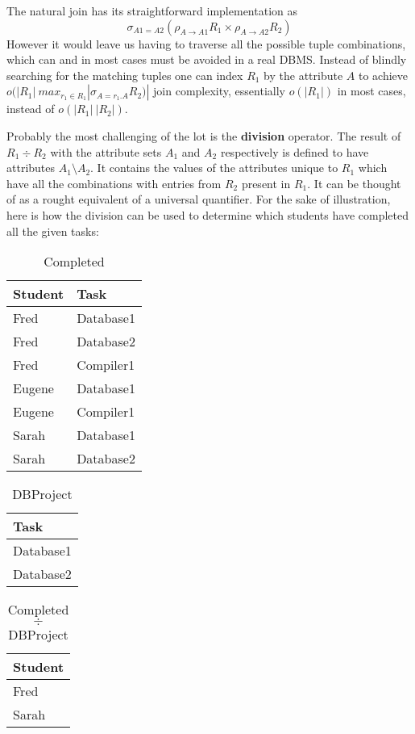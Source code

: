 \documentclass[12pt]{article}
\begin{document}
The natural join has its straightforward implementation as
$$\sigma_{A1=A2}(\rho_{A  \rightarrow  A1} R_1 \times \rho_{A \rightarrow A2} R_2)$$
However it would leave us having to traverse all the possible tuple combinations, which can and in most
cases must be avoided in a real DBMS. Instead of blindly searching for the matching tuples one
can index $R_1$ by the attribute $A$ to achieve $o(|R_1|\ max_{r_1 \in R_1} |\sigma_{A={r_1}.A} R_2 )|$
join complexity, essentially $o(|R_1|)$ in most cases, instead of $o(|R_1|\ |R_2|)$.

Probably the most challenging of the lot is the \textbf{division} operator. The result of $R_1 \div R_2$ with the
attribute sets $A_1$ and $A_2$ respectively is defined to have attributes $A_1 \setminus A_2$. It contains
the values of the attributes unique to $R_1$ which have all the combinations with entries from $R_2$
present in $R_1$. It can be thought of as a rought equivalent of a universal quantifier.
For the sake of illustration, here is how the division can be used to determine which students have
completed all the given tasks:

\begin{table}[H]
\caption{Completed}
\centering
\begin{tabular}{ l l }
Student & Task \\
\hline
Fred & Database1 \\
Fred & Database2 \\
Fred & Compiler1 \\
Eugene & Database1 \\
Eugene & Compiler1 \\
Sarah & Database1 \\
Sarah & Database2 \\
\end{tabular}
\end{table}

\begin{table}[H]
\caption{DBProject}
\centering
\begin{tabular}{ l }
Task \\
\hline
Database1 \\
Database2 \\
\end{tabular}
\end{table}

\begin{table}[H]
\caption{Completed $\div$ DBProject}
\centering
\begin{tabular}{ l }
Student \\
\hline
Fred \\
Sarah \\
\end{tabular}
\end{table}
\end{document}
